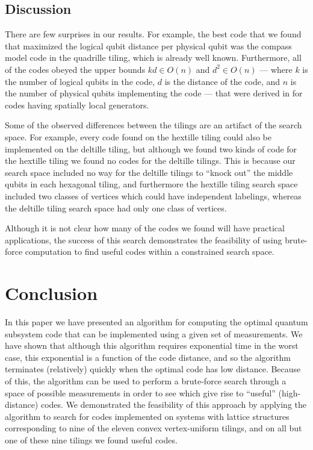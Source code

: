 \documentclass[twocolumn,showpacs,preprintnumbers,amsmath,amssymb,nofootinbib,pra,floatfix]{revtex4-1}
\begin{document}
\subsection{Discussion} \label{sec:discussion}

There are few surprises in our results.  For example, the best code that we found that maximized the logical qubit distance per physical qubit was the compass model code in the quadrille tiling, which is already well known.  Furthermore, all of the codes obeyed the upper bounds $kd\in O(n)$ and $d^2\in O(n)$ --- where $k$ is the number of logical qubits in the code, $d$ is the distance of the code, and $n$ is the number of physical qubits implementing the code --- that were derived in \cite{Bravyi:10a} for codes having spatially local generators.

Some of the observed differences between the tilings are an artifact of the search space.  For example, every code found on the hextille tiling could also be implemented on the deltille tiling, but although we found two kinds of code for the hextille tiling we found no codes for the deltille tilings.  This is because our search space included no way for the deltille tilings to ``knock out'' the middle qubits in each hexagonal tiling, and furthermore the hextille tiling search space included two classes of vertices which could have independent labelings, whereas the deltille tiling search space had only one class of vertices.

Although it is not clear how many of the codes we found will have practical applications, the success of this search demonstrates the feasibility of using brute-force computation to find useful codes within a constrained search space.
\section{Conclusion}
\label{sec:conclusion}

In this paper we have presented an algorithm for computing the optimal quantum subsystem code that can be implemented using a given set of measurements.  We have shown that although this algorithm requires exponential time in the worst case, this exponential is a function of the code distance, and so the algorithm terminates (relatively) quickly when the optimal code has low distance.  Because of this, the algorithm can be used to perform a brute-force search through a space of possible measurements in order to see which give rise to ``useful'' (high-distance) codes.  We demonstrated the feasibility of this approach by applying the algorithm to search for codes implemented on systems with lattice structures corresponding to nine of the eleven convex vertex-uniform tilings, and on all but one of these nine tilings we found useful codes.
\end{document}
